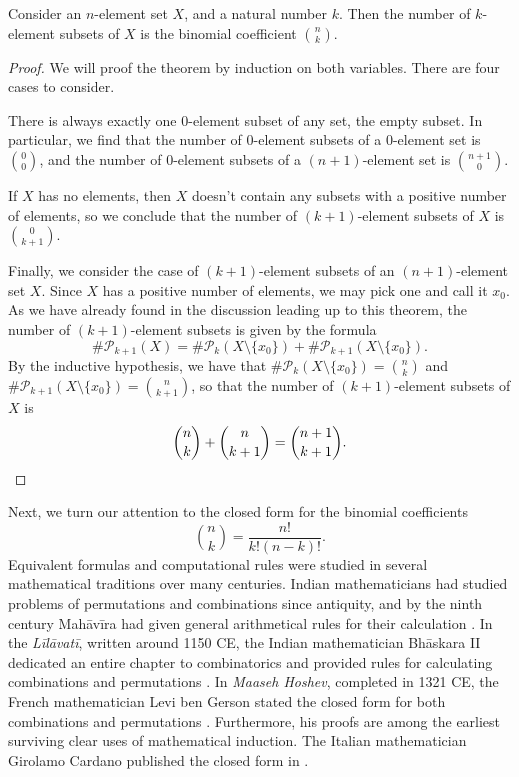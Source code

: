 \begin{theorem}
  Consider an $n$-element set $X$, and a natural number $k$. Then the number of $k$-element subsets of $X$ is the binomial coefficient $\binom{n}{k}$.
\end{theorem}

\begin{proof}
  We will proof the theorem by induction on both variables. There are four cases to consider.

  There is always exactly one $0$-element subset of any set, the empty subset. In particular, we find that the number of $0$-element subsets of a $0$-element set is $\binom{0}{0}$, and the number of $0$-element subsets of a $(n+1)$-element set is $\binom{n+1}{0}$.

  If $X$ has no elements, then $X$ doesn't contain any subsets with a positive number of elements, so we conclude that the number of $(k+1)$-element subsets of $X$ is $\binom{0}{k+1}$.

  Finally, we consider the case of $(k+1)$-element subsets of an $(n+1)$-element set $X$. Since $X$ has a positive number of elements, we may pick one and call it $x_0$. As we have already found in the discussion leading up to this theorem, the number of $(k+1)$-element subsets is given by the formula
  \begin{equation*}
    \#\mathcal{P}_{k+1}(X)= \#\mathcal{P}_k(X\setminus\{x_0\})+\#\mathcal{P}_{k+1}(X\setminus\{x_0\}).
  \end{equation*}
  By the inductive hypothesis, we have that $\#\mathcal{P}_k(X\setminus\{x_0\})=\binom{n}{k}$ and $\#\mathcal{P}_{k+1}(X\setminus\{x_0\})=\binom{n}{k+1}$, so that the number of $(k+1)$-element subsets of $X$ is
  \begin{equation*}
    \binom{n}{k} + \binom{n}{k+1} = \binom{n+1}{k+1}.\qedhere
  \end{equation*}
\end{proof}

Next, we turn our attention to the closed form for the binomial coefficients
\begin{equation*}
  \binom{n}{k}=\frac{n!}{k!(n-k)!}.
\end{equation*}
Equivalent formulas and computational rules were studied in several mathematical traditions over many centuries. Indian mathematicians had studied problems of permutations and combinations since antiquity, and by the ninth century Mahāvīra had given general arithmetical rules for their calculation \cite{mahavira1912}. In the \emph{Līlāvatī}, written around 1150 CE, the Indian mathematician Bhāskara II dedicated an entire chapter to combinatorics and provided rules for calculating combinations and permutations \cite{bhaskara1817}. In \emph{Maaseh Hoshev}, completed in 1321 CE, the French mathematician Levi ben Gerson stated the closed form for both combinations and permutations \cite{gerson1909}. Furthermore, his proofs are among the earliest surviving clear uses of mathematical induction. The Italian mathematician Girolamo Cardano published the closed form in \cite{cardano1570}.

